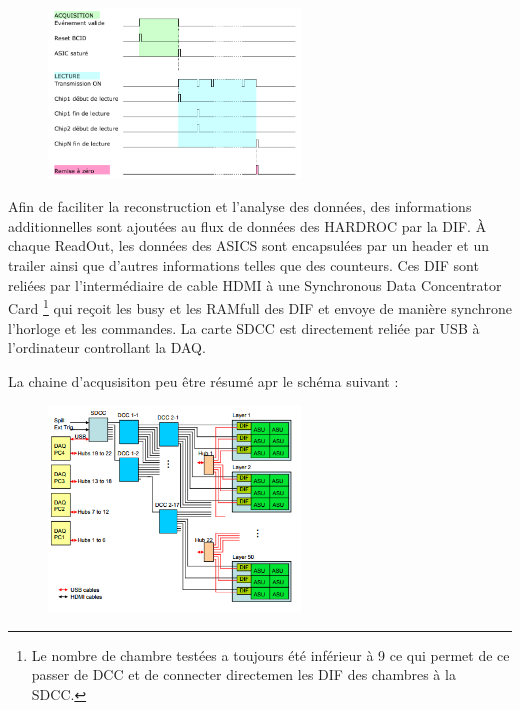 \begin{figure}[ht!]
	\centering
	\includegraphics[width=0.6\textwidth]{GLA/cycle.png}
	\label{temp}
\end{figure}
Afin de faciliter la reconstruction et l'analyse des données, des informations additionnelles sont ajoutées au flux de données des HARDROC par la DIF. À chaque ReadOut, les données des ASICS sont encapsulées par un header et un trailer ainsi que d'autres informations telles que des counteurs. Ces DIF sont reliées par l'intermédiaire de cable HDMI à une Synchronous Data Concentrator Card \footnote{Le nombre de chambre testées a toujours été inférieur à 9 ce qui permet de ce passer de DCC et de connecter directemen les DIF des chambres à la SDCC.} \cite{Baulieu:2015pfa} qui reçoit les busy et les RAMfull des DIF et envoye de manière synchrone l'horloge et les commandes. La carte SDCC est directement reliée par USB à l'ordinateur controllant la DAQ.

La chaine d'acqusisiton peu être résumé apr le schéma suivant : 
\begin{figure}[ht!]
	\centering
	\includegraphics[width=0.6\textwidth]{GLA/chaine.png}
\end{figure}


